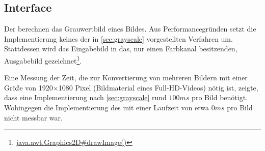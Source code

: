 \subsection{Interface }
Der  berechnen das Grauwertbild eines Bildes.
Aus Performancegründen setzt die Implementierung  keines der in \autoref{sec:grayscale} vorgestellten Verfahren um.
Stattdessen wird das Eingabebild in das, nur einen Farbkanal besitzenden, Ausgabebild gezeichnet\footnote{\href{http://docs.oracle.com/javase/6/docs/api/java/awt/Graphics2D.html\#drawImage(java.awt.image.BufferedImage, java.awt.image.BufferedImageOp, int, int)}{java.awt.Graphics2D\#drawImage()}}.

Eine Messung der Zeit, die zur Konvertierung von mehreren Bildern mit einer Größe von 1920$\times$1080 Pixel (Bildmaterial eines Full-HD-Videos) nötig ist, zeigte, dass eine Implementierung nach \autoref{sec:grayscale} rund $100\unit{ms}$ pro Bild benötigt.
Wohingegen die Implementierung des  mit einer Laufzeit von etwa $0\unit{ms}$ pro Bild nicht messbar war.

